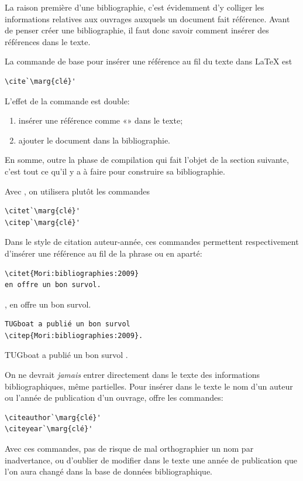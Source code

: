 La raison première d'une bibliographie, c'est évidemment d'y colliger
les informations relatives aux ouvrages auxquels un document fait
référence. Avant de penser créer une bibliographie, il faut donc
savoir comment insérer des références dans le texte.

La commande de base pour insérer une référence au fil du texte dans
{\LaTeX} est
\begin{lstlisting}
\cite`\marg{clé}'
\end{lstlisting}
L'effet de la commande est double:
\begin{enumerate}
\item insérer une référence comme «»
  dans le texte;
\item ajouter le document dans la bibliographie.
\end{enumerate}
En somme, outre la phase de compilation qui fait l'objet de la section
suivante, c'est tout ce qu'il y a à faire pour construire sa
bibliographie.

Avec , on utilisera plutôt les commandes
\begin{lstlisting}
\citet`\marg{clé}'
\citep`\marg{clé}'
\end{lstlisting}
Dans le style de citation auteur-année, ces commandes permettent
respectivement d'insérer une référence au fil de la phrase ou en
aparté:
\begin{demo}
  \begin{texample}[0.55\linewidth]
\begin{lstlisting}
\citet{Mori:bibliographies:2009}
en offre un bon survol.
\end{lstlisting}
    \producing
    \citet{Mori:bibliographies:2009},
    en offre un bon survol.
  \end{texample}
  \begin{texample}[0.55\linewidth]
\begin{lstlisting}
TUGboat a publié un bon survol
\citep{Mori:bibliographies:2009}.
\end{lstlisting}
    \producing
    TUGboat a publié un bon survol
    \citep{Mori:bibliographies:2009}.
  \end{texample}
\end{demo}

On ne devrait \emph{jamais} entrer directement dans le texte des
informations bibliographiques, même partielles. Pour insérer dans le
texte le nom d'un auteur ou l'année de publication d'un ouvrage,
 offre les commandes:
\begin{lstlisting}
\citeauthor`\marg{clé}'
\citeyear`\marg{clé}'
\end{lstlisting}
Avec ces commandes, pas de risque de mal orthographier un nom par
inadvertance, ou d'oublier de modifier dans le texte une année de
publication que l'on aura changé dans la base de données
bibliographique.

